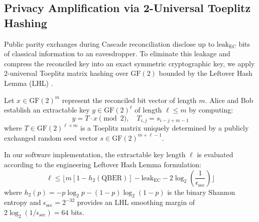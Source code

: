 \documentclass[journal,10pt,twocolumn]{article}
\begin{document}
\subsection{Privacy Amplification via 2-Universal Toeplitz Hashing}
Public parity exchanges during Cascade reconciliation disclose up to $\text{leak}_{\text{EC}}$ bits of classical information to an eavesdropper. To eliminate this leakage and compress the reconciled key into an exact symmetric cryptographic key, we apply 2-universal Toeplitz matrix hashing over $\text{GF}(2)$ bounded by the Leftover Hash Lemma (LHL) \cite{bennett1995generalized, tomamichel2012tight}.

Let $x \in \text{GF}(2)^m$ represent the reconciled bit vector of length $m$. Alice and Bob establish an extractable key $y \in \text{GF}(2)^\ell$ of length $\ell \le m$ by computing:
\begin{equation}
y = T \cdot x \pmod 2, \quad T_{i, j} = s_{i - j + m - 1}
\end{equation}
where $T \in \text{GF}(2)^{\ell \times m}$ is a Toeplitz matrix uniquely determined by a publicly exchanged random seed vector $s \in \text{GF}(2)^{m + \ell - 1}$. 

In our software implementation, the extractable key length $\ell$ is evaluated according to the engineering Leftover Hash Lemma formulation:
\begin{equation}
\ell \le \lfloor m [1 - h_2(\text{QBER})] - \text{leak}_{\text{EC}} - 2 \log_2\left(\frac{1}{\epsilon_{\text{sec}}}\right) \rfloor
\label{eq:leftover_hash}
\end{equation}
where $h_2(p) = -p \log_2 p - (1-p) \log_2(1-p)$ is the binary Shannon entropy and $\epsilon_{\text{sec}} = 2^{-32}$ provides an LHL smoothing margin of $2\log_2(1/\epsilon_{\text{sec}}) = 64$ bits. 
\end{document}

